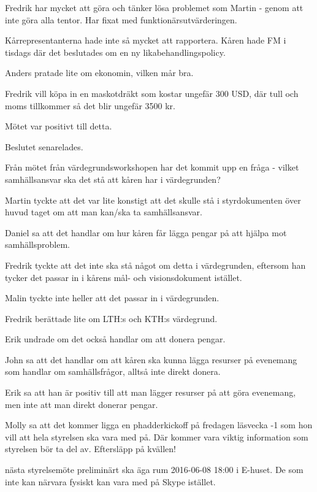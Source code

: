 \documentclass[10pt]{article}
\begin{document}
\begin{paragrafer}
\begin{paragrafer}
Fredrik har mycket att göra och tänker lösa problemet som Martin - genom att inte göra alla tentor. Har fixat med funktionärsutvärderingen.

Kårrepresentanterna hade inte så mycket att rapportera. Kåren hade FM i tisdags där det beslutades om en ny likabehandlingspolicy.

Anders pratade lite om ekonomin, vilken mår bra.

\end{paragrafer}

Fredrik vill köpa in en maskotdräkt som kostar ungefär 300 USD, där tull och moms tillkommer så det blir ungefär 3500 kr.

Mötet var positivt till detta.

Beslutet senarelades.

Från mötet från värdegrundsworkshopen har det kommit upp en fråga - vilket samhällsansvar ska det stå att kåren har i värdegrunden?

Martin tyckte att det var lite konstigt att det skulle stå i styrdokumenten över huvud taget om att man kan/ska ta samhällsansvar.

Daniel sa att det handlar om hur kåren får lägga pengar på att hjälpa mot samhällsproblem.

Fredrik tyckte att det inte ska stå något om detta i värdegrunden, eftersom han tycker det passar in i kårens mål- och visionsdokument istället.

Malin tyckte inte heller att det passar in i värdegrunden.

Fredrik berättade lite om LTH:s och KTH:s värdegrund.

Erik undrade om det också handlar om att donera pengar.

John sa att det handlar om att kåren ska kunna lägga resurser på evenemang som handlar om samhällsfrågor, alltså inte direkt donera.

Erik sa att han är positiv till att man lägger resurser på att göra evenemang, men inte att man direkt donerar pengar.

Molly sa att det kommer ligga en phadderkickoff på fredagen läsvecka -1 som hon vill att hela styrelsen ska vara med på. Där kommer vara viktig information som styrelsen bör ta del av. Eftersläpp på kvällen!

\Mba nästa styrelsemöte preliminärt ska äga rum 2016-06-08 18:00 i E-huset. De som inte kan närvara fysiskt kan vara med på Skype istället.


\end{paragrafer}
\end{document}
